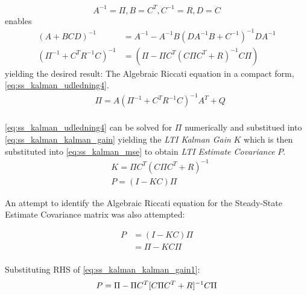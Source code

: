 \begin{equation}
		{A}^{-1} = \Pi, {B} = {C}^T, {C}^{-1} = {R}, {D} = {C} \label{eq:ss_kalman_udledning3}
\end{equation}
enables 
\begin{align}
		({A}+{BCD})^{-1} &= {A}^{-1} - {A}^{-1}{B} ({D}{A}^{-1}{B}+{C}^{-1})^{-1}{D}{A}^{-1} \\ \label{eq:ss_kalman_MatrixInversionLemma}
		(\Pi^{-1} + {C}^T {R}^{-1} {C})^{-1} &= (\Pi - \Pi {C}^T ({C} \Pi {C}^T + {R})^{-1} {C} \Pi)
\end{align}
yielding the desired result: The Algebraic Riccati equation in a compact form, \cref{eq:ss_kalman_udledning4}.
\begin{equation}
	\begin{split}\label{eq:ss_kalman_udledning4}
		&\Pi = {A} (\Pi^{-1} + {C}^T {R}^{-1} {C})^{-1} {A}^T + {Q}\\
	\end{split}
\end{equation}

\cref{eq:ss_kalman_udledning4} can be solved for $\Pi$ numerically and substitued into \cref{eq:ss_kalman_kalman_gain} yielding the \textit{LTI Kalman Gain} $ K $ which is then substituted into \cref{eq:ss_kalman_mse} to obtain \textit{LTI Estimate Covariance} $ P $.
\begin{align}
	& K = \Pi {C}^T ({C} \Pi {C}^T + {R})^{-1} \label{eq:ss_kalman_kalman_gain1} \\
	& P = ({I} - K {C}) \Pi \label{eq:ss_kalman_mse1} 
\end{align}

An attempt to identify the Algebraic Riccati equation for the Steady-State Estimate Covariance matrix was also attempted:


\begin{equation}
	\begin{split}\label{eq:ss_kalman_udledning5}
	 	P 	& = ({I} - K {C}) \Pi \\ %
		& = \Pi - K {C}\Pi \\	
	\end{split}
\end{equation}

Substituting RHS of \cref{eq:ss_kalman_kalman_gain1}:
\begin{equation}\label{eq:ss_kalman_udledning5_v2}
		P = \Pi - \Pi {C}^T [{C} \Pi {C}^T + {R}]^{-1}{C}\Pi \\
\end{equation}

